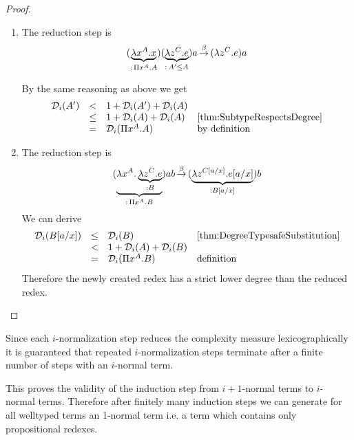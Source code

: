 \begin{theorem}
\begin{proof}
\begin{enumerate}
            \item The reduction step is
                $$
                (\underbrace{\lambda x^A. x}_{:\, \Pi x^A. A})
                (\underbrace{\lambda z^C. e}_{:\, A' \le A})
                a
                {\,\stackrel{\beta}{\to}\,}
                (\lambda z^C. e) a
                $$

                By the same reasoning as above we get
                $$
                \begin{array}{llll}
                    {\cal D}_i(A')
                    &<& 1 + {\cal D}_i(A') + {\cal D}_i(A)
                    \\
                    &\le & 1 + {\cal D}_i(A) + {\cal D}_i(A)
                    & \text{\ref{thm:SubtypeRespectsDegree}}
                    \\
                    & = & {\cal D}_i(\Pi x^A. A) &\text{by definition}
                \end{array}
                $$


            \item The reduction step is
                $$
                (\underbrace{\lambda x^A.
                \underbrace{\lambda z^C.e}_{: B}}_{:\, \Pi x^A. B})
                a
                b
                {\,\stackrel{\beta}{\to}\,}
                (\underbrace{\lambda z^{C[a/x]}.  e[a/x]}_{: B[a/x]})
                b
                $$
                We can derive
                $$
                \begin{array}{llll}
                    {\cal D}_i(B[a/x])
                    &\le& {\cal D}_i(B)
                    &\text{\ref{thm:DegreeTypesafeSubstitution}}
                    \\
                    &<& 1 + {\cal D}_i(A) + {\cal D}_i(B)
                    \\
                    &=& {\cal D}_i(\Pi x^A.B)
                    &\text{definition}
                \end{array}
                $$
                Therefore the newly created redex has a strict lower degree than
                the reduced redex.
        \end{enumerate}
    \end{proof}
\end{theorem}


Since each $i$-normalization step reduces the complexity measure
lexicographically it is guaranteed that repeated $i$-normalization steps
terminate after a finite number of steps with an $i$-normal term.

This proves the validity of the induction step from $i+1$-normal terms to
$i$-normal terms. Therefore after finitely many induction steps we can generate
for all welltyped terms an 1-normal term i.e. a term which contains only
propositional redexes.
